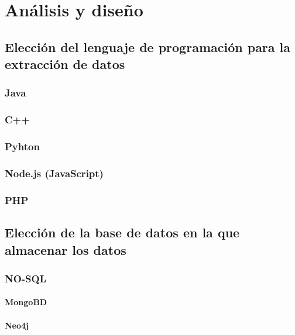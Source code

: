 \documentclass[a4paper,openright,11pt,spanish]{book}
\begin{document}
 




\cleardoublepage
{}
\tableofcontents
%




\chapter{Análisis y diseño}
\setcounter{section}{0}
\section{Elección del lenguaje de programación para la extracción de datos}
\subsection{Java}
\subsection{C++}
\subsection{Pyhton}
\subsection{Node.js (JavaScript)}
\subsection{PHP}
\section{Elección de la base de datos en la que almacenar los datos}
\setcounter{section}{0}
\subsection{NO-SQL}
\subsubsection{MongoBD}
\subsubsection{Neo4j}
\end{document}
